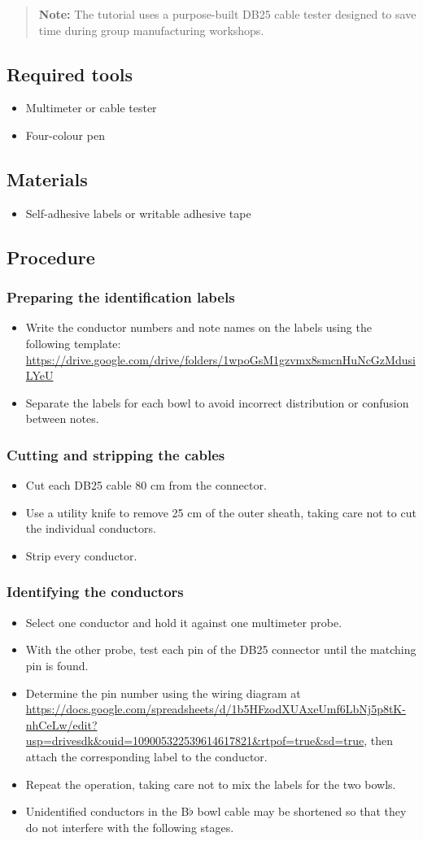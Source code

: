 \documentclass[11pt,a4paper]{article}
\newcommand{\tools}{\subsection{Required tools}}
\newcommand{\materials}{\subsection{Materials}}
\newcommand{\procedure}{\subsection{Procedure}}
\newcommand{\note}[1]{\begin{quote}\textbf{Note:} #1\end{quote}}
\begin{document}
\note{The tutorial uses a purpose-built DB25 cable tester designed to save time during group manufacturing workshops.}

\tools
\begin{itemize}
  \item Multimeter or cable tester
  \item Four-colour pen
\end{itemize}

\materials
\begin{itemize}
  \item Self-adhesive labels or writable adhesive tape
\end{itemize}

\procedure
\subsubsection{Preparing the identification labels}
\begin{itemize}
  \item Write the conductor numbers and note names on the labels using the following template: \url{https://drive.google.com/drive/folders/1wpoGsM1gzvmx8smcnHuNcGzMdusiLYeU}
  \item Separate the labels for each bowl to avoid incorrect distribution or confusion between notes.
\end{itemize}

\subsubsection{Cutting and stripping the cables}
\begin{itemize}
  \item Cut each DB25 cable 80 cm from the connector.
  \item Use a utility knife to remove 25 cm of the outer sheath, taking care not to cut the individual conductors.
  \item Strip every conductor.
\end{itemize}

\subsubsection{Identifying the conductors}
\begin{itemize}
  \item Select one conductor and hold it against one multimeter probe.
  \item With the other probe, test each pin of the DB25 connector until the matching pin is found.
  \item Determine the pin number using the wiring diagram at \url{https://docs.google.com/spreadsheets/d/1b5HFzodXUAxeUmf6LbNj5p8tK-nhCeLw/edit?usp=drivesdk&ouid=109005322539614617821&rtpof=true&sd=true}, then attach the corresponding label to the conductor.
  \item Repeat the operation, taking care not to mix the labels for the two bowls.
  \item Unidentified conductors in the B$\flat$ bowl cable may be shortened so that they do not interfere with the following stages.
\end{itemize}
\end{document}
